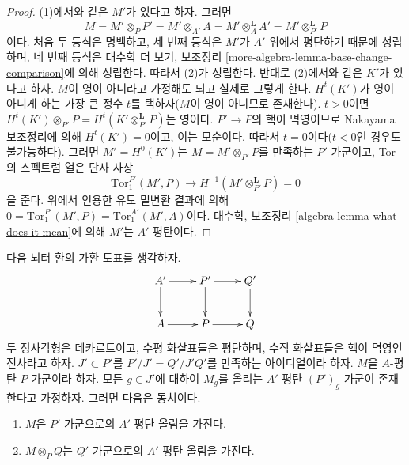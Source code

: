 \begin{proof}
(1)에서와 같은 $M'$가 있다고 하자. 그러면
$$
M = M' \otimes_P P' = M' \otimes_{A'} A =
M' \otimes_A^\mathbf{L} A' = M' \otimes_{P'}^\mathbf{L} P
$$%
이다. 처음 두 등식은 명백하고, 세 번째 등식은 $M'$가 $A'$ 위에서
평탄하기 때문에 성립하며, 네 번째 등식은 대수학 더 보기, 보조정리
\ref{more-algebra-lemma-base-change-comparison}에 의해 성립한다. 따라서
(2)가 성립한다. 반대로 (2)에서와 같은 $K'$가 있다고 하자. $M$이 영이
아니라고 가정해도 되고 실제로 그렇게 한다. $H^t(K')$가 영이 아니게 하는
가장 큰 정수 $t$를 택하자($M$이 영이 아니므로 존재한다). $t > 0$이면
$H^t(K') \otimes_{P'} P = H^t(K' \otimes_{P'}^\mathbf{L} P)$는 영이다.
$P' \to P$의 핵이 멱영이므로 Nakayama 보조정리에 의해
$H^t(K') = 0$이고, 이는 모순이다. 따라서 $t = 0$이다($t < 0$인 경우도
불가능하다). 그러면 $M' = H^0(K')$는
$M = M' \otimes_{P'} P$를 만족하는 $P'$-가군이고, Tor의 스펙트럼 열은
단사 사상
$$
\text{Tor}_1^{P'}(M', P) \to H^{-1}(M' \otimes_{P'}^\mathbf{L} P) = 0
$$
을 준다. 위에서 인용한 유도 밑변환 결과에 의해
$0 = \text{Tor}_1^{P'}(M', P) = \text{Tor}_1^{A'}(M', A)$이다.
대수학, 보조정리 \ref{algebra-lemma-what-does-it-mean}에 의해 $M'$는
$A'$-평탄이다.
\end{proof}

\begin{lemma}
\label{lemma-lift-equivalence-module}
다음 뇌터 환의 가환 도표를 생각하자.
$$
\xymatrix{
A' \ar[d] \ar[r] &
P' \ar[d] \ar[r] &
Q' \ar[d] \\
A \ar[r] &
P \ar[r] &
Q
}
$$
두 정사각형은 데카르트이고, 수평 화살표들은 평탄하며, 수직 화살표들은
핵이 멱영인 전사라고 하자. $J' \subset P'$를
$P'/J' = Q'/J'Q'$를 만족하는 아이디얼이라 하자. $M$을 $A$-평탄
$P$-가군이라 하자. 모든 $g \in J'$에 대하여 $M_g$를 올리는
$A'$-평탄 $(P')_g$-가군이 존재한다고 가정하자. 그러면 다음은 동치이다.
\begin{enumerate}
\item $M$은 $P'$-가군으로의 $A'$-평탄 올림을 가진다.
\item $M \otimes_P Q$는 $Q'$-가군으로의 $A'$-평탄 올림을 가진다.
\end{enumerate}
\end{lemma}

